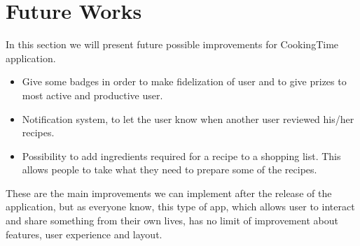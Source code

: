 \chapter{Future Works}
In this section we will present future possible improvements for CookingTime application.
\begin{itemize}
	\item Give some badges in order to make fidelization of user and to give prizes to most active and productive user.
	\item Notification system, to let the user know when another user reviewed his/her recipes. 
	\item Possibility to add ingredients required for a recipe to a shopping list. This allows people to take what they need to prepare some of the recipes.
\end{itemize}
These are the main improvements we can implement after the release of the application, but as everyone know, this type of app, which allows user to interact and share something from their own lives, has no limit of improvement about features, user experience and layout.
